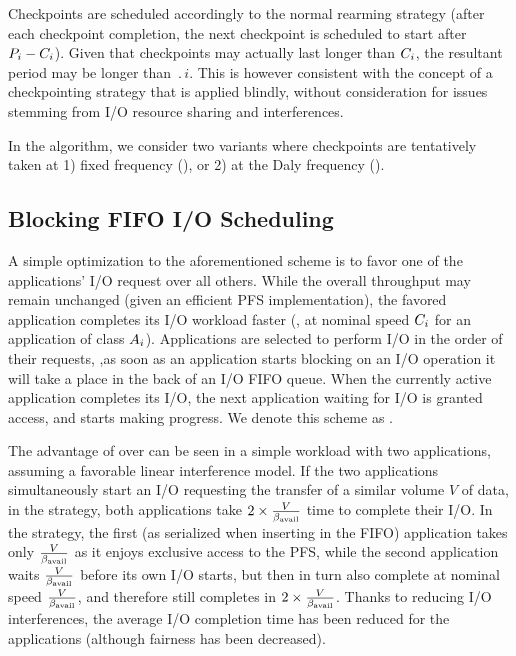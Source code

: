 Checkpoints are scheduled accordingly to the normal rearming strategy
(\ie after each checkpoint completion, the next checkpoint is scheduled
to start after $P_{i}-C_{i}$). Given that checkpoints may actually
last longer than $C_{i}$, the resultant period may be longer than
$\period{i}$. This is however consistent with the concept of a
checkpointing strategy that is applied blindly, without consideration
for issues stemming from I/O resource sharing and interferences.

In the \nocoop algorithm, we consider two variants where checkpoints are
tentatively taken at 1) fixed frequency (\propfixed), or 2) at the
Daly frequency (\propdaly).

\subsection{Blocking \fifoblock FIFO I/O Scheduling}
\label{sec:fifoblock}

A simple optimization to the aforementioned scheme is to favor one of
the applications' I/O request over all others. While the overall throughput
may remain unchanged (given an efficient PFS implementation), the favored
application completes its I/O workload faster (\ie, at nominal speed
$C_{i}$ for an application of class $A_{i}$).
Applications are selected to perform I/O in the order of their requests,
\ie ,as soon as an application starts blocking on an I/O operation it will
take a place in the back of an  I/O FIFO queue. When the currently
active application completes its I/O, the next application waiting for I/O
is granted access, and starts making progress. We denote this scheme as
\fifoblock.

The advantage of \fifoblock over \nocoop can be seen in a simple workload with two
applications, assuming a favorable linear interference model.
If the two applications simultaneously start an I/O requesting the
transfer of a similar volume $V$ of data, in the \nocoop strategy,
both applications take $2 \times \frac{V}{\beta_{\text{avail}}}$ time to complete
their I/O. In the \fifoblock strategy, the first (as serialized when
inserting in the FIFO) application takes only $\frac{V}{\beta_{\text{avail}}}$
as it enjoys exclusive access to the PFS, while the second application
waits $\frac{V}{\beta_{\text{avail}}}$ before its own I/O starts, but then in turn
also complete at nominal speed $\frac{V}{\beta_{\text{avail}}}$, and therefore still
completes in $2 \times \frac{V}{\beta_{\text{avail}}}$. Thanks
to reducing I/O interferences, the average I/O completion time
has been reduced for the applications (although fairness has been decreased).

